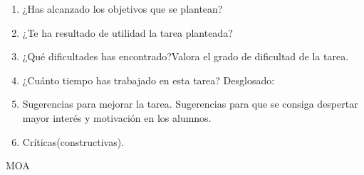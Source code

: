 \documentclass[10pt,a4paper]{article}
\begin{document}
\begin{enumerate}

	\item ¿Has alcanzado los objetivos que se plantean? 
	
	\item ¿Te ha resultado de utilidad la tarea planteada?

	\item ¿Qué dificultades has encontrado?Valora el grado de dificultad de la tarea.

	\item  ¿Cuánto tiempo has trabajado en esta tarea? Desglosado:

		\begin{table}[H]
		\centering
		\end{table}

	\item  Sugerencias para mejorar la tarea. Sugerencias para que se consiga
	despertar mayor interés y motivación en los alumnos.\par

	\item  Críticas(constructivas).

\end{enumerate} 

\newpage

\begin{thebibliography}{X}

	 MOA	
	
\end{thebibliography}

\end{document}

